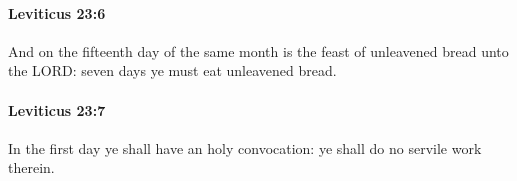 		\paragraph{Leviticus 23:6} %
			\label{LEVITICUS-23-6}

			And on the fifteenth day of the same month is the feast of unleavened bread unto the LORD: seven days ye must eat unleavened bread.


		\paragraph{Leviticus 23:7} %
			\label{LEVITICUS-23-7}

			In the first day ye shall have an holy convocation: ye shall do no servile work therein.


